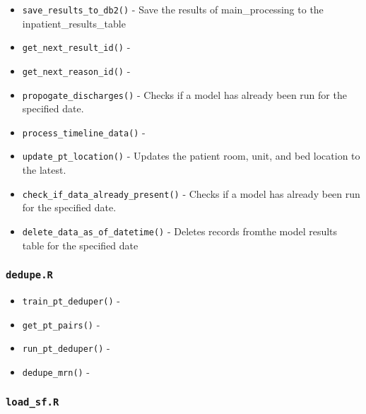 \documentclass[
]{book}
\providecommand{\tightlist}{%
  \setlength{\itemsep}{0pt}\setlength{\parskip}{0pt}}
\begin{document}
\begin{itemize}
\tightlist
\item
  \texttt{save\_results\_to\_db2()} - Save the results of main\_processing to the inpatient\_results\_table
\item
  \texttt{get\_next\_result\_id()} -
\item
  \texttt{get\_next\_reason\_id()} -
\item
  \texttt{propogate\_discharges()} - Checks if a model has already been run for the specified date.
\item
  \texttt{process\_timeline\_data()} -
\item
  \texttt{update\_pt\_location()} - Updates the patient room, unit, and bed location to the latest.
\item
  \texttt{check\_if\_data\_already\_present()} - Checks if a model has already been run for the specified date.
\item
  \texttt{delete\_data\_as\_of\_datetime()} - Deletes records fromthe model results table for the specified date
\end{itemize}

\hypertarget{dedupe.r}{%
\subsubsection{\texorpdfstring{\texttt{dedupe.R}}{dedupe.R}}\label{dedupe.r}}

\begin{itemize}
\tightlist
\item
  \texttt{train\_pt\_deduper()} -
\item
  \texttt{get\_pt\_pairs()} -
\item
  \texttt{run\_pt\_deduper()} -
\item
  \texttt{dedupe\_mrn()} -
\end{itemize}

\hypertarget{load_sf.r}{%
\subsubsection{\texorpdfstring{\texttt{load\_sf.R}}{load\_sf.R}}\label{load_sf.r}}
\end{document}
